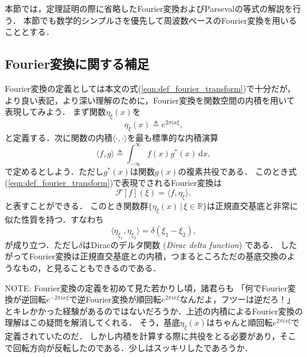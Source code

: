 %

本節では，定理証明の際に省略したFourier変換およびParsevalの等式の解説を行う．
本節でも数学的シンプルさを優先して周波数ベースのFourier変換を用いることとする．

\subsection*{Fourier変換に関する補足}

Fourier変換の定義としては本文の式(\ref{eqn:def_fourier_transform})で十分だが，
より良い表記，より深い理解のために，Fourier変換を関数空間の内積を用いて表現してみよう．
まず関数$\eta_{\xi}(x)$を
\begin{equation}
    \eta_{\xi}(x) \triangleq e^{2\pi i x \xi},
\end{equation}
と定義する．次に関数の内積$\langle \cdot, \cdot \rangle$を最も標準的な内積演算
\begin{equation}
    \langle f, g \rangle \triangleq \int_{-\infty}^{\infty} f(x) g^*(x) \, \mathrm{d}x,
\end{equation}
で定めるとしよう．ただし$g^*(x)$は関数$g(x)$の複素共役である．
このとき式(\ref{eqn:def_fourier_transform})で表現でされるFourier変換は
\begin{equation}
    \mathcal{F}[f](\xi) = \langle f, \eta_{\xi} \rangle,
\end{equation}
と表すことができる．
このとき関数群$\{ \eta_{\xi}(x) \,|\, \xi \in \mathbb{R} \}$は正規直交基底と非常に似た性質を持つ．すなわち
\begin{equation}
    \langle \eta_{\xi_1}, \eta_{\xi_2} \rangle = \delta(\xi_1 - \xi_2),
\end{equation}
が成り立つ．ただし$\delta$はDiracのデルタ関数 (\textit{Dirac delta function}) である．
したがってFourier変換は正規直交基底との内積，つまるところただの基底交換のようなもの，と見ることもできるのである．

\begin{displayquote}\footnotesize\textsf{NOTE:}
    Fourier変換の定義を初めて見た若かりし頃，諸君らも
    「何でFourier変換が逆回転$e^{-2\pi i x \xi}$で逆Fourier変換が順回転$e^{2\pi i x \xi}$なんだよ，フツーは逆だろ！」
    とキレかかった経験があるのではないだろうか．上述の内積によるFourier変換の理解はこの疑問を解消してくれる．
    そう，基底$\eta_{\xi}(x)$はちゃんと順回転$e^{2\pi i x \xi}$で定義されていたのだ．
    しかし内積を計算する際に共役をとる必要があり，そこで回転方向が反転したのである．少しはスッキリしたであろうか．
\end{displayquote}


